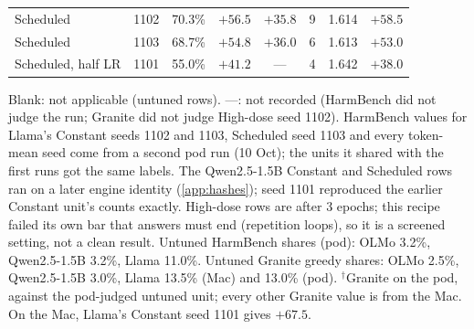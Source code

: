 \documentclass{article}
\begin{document}
\begin{table}[!htbp]
\begin{tabular}{@{}l c c c c c c c@{}}
    Scheduled & 1102 & 70.3\% & $+56.5$ & $+35.8$ & 9 & 1.614 & $+58.5$ \\
    Scheduled & 1103 & 68.7\% & $+54.8$ & $+36.0$ & 6 & 1.613 & $+53.0$ \\
    Scheduled, half LR & 1101 & 55.0\% & $+41.2$ & --- & 4 & 1.642 & $+38.0$ \\
    \bottomrule
  \end{tabular}

  \smallskip
  \parbox{\textwidth}{\footnotesize\raggedright
    Blank: not applicable (untuned rows). ---: not recorded (HarmBench did not
    judge the run; Granite did not judge High-dose seed 1102). HarmBench
    values for Llama's Constant seeds 1102 and 1103, Scheduled seed 1103 and
    every token-mean seed come from a second pod run (10 Oct); the units it
    shared with the first runs got the same labels. The Qwen2.5-1.5B Constant
    and Scheduled rows ran on a later engine identity (\cref{app:hashes});
    seed 1101 reproduced the earlier Constant unit's counts exactly. High-dose
    rows are after 3 epochs; this recipe failed its own bar that answers must
    end (repetition loops), so it is a screened setting, not a clean result.
    Untuned HarmBench shares (pod): OLMo 3.2\%, Qwen2.5-1.5B 3.2\%, Llama
    11.0\%. Untuned Granite greedy shares: OLMo 2.5\%, Qwen2.5-1.5B 3.0\%,
    Llama 13.5\% (Mac) and 13.0\% (pod). $^{\dagger}$Granite on the pod,
    against the pod-judged untuned unit; every other Granite value is from the
    Mac. On the Mac, Llama's Constant seed 1101 gives $+67.5$.}
\end{table}
\end{document}
